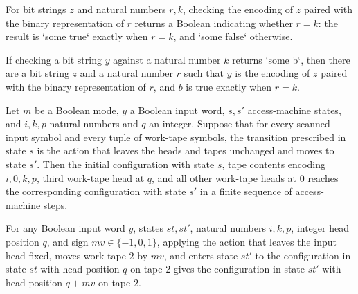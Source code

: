 \begin{lemma}
\label{Complexity.LogProg.accessCheck_pair}
\leanok
{}
For bit strings $z$ and natural numbers $r,k$, checking the encoding of $z$ paired with
the binary representation of $r$ returns a Boolean indicating whether $r=k$: the result
is `some true` exactly when $r=k$, and `some false` otherwise.
\end{lemma}

\begin{lemma}
\label{Complexity.LogProg.accessCheck_some}
\leanok
{}
If checking a bit string $y$ against a natural number $k$ returns `some b`, then there
are a bit string $z$ and a natural number $r$ such that $y$ is the encoding of $z$
paired with the binary representation of $r$, and $b$ is true exactly when $r=k$.
\end{lemma}

\begin{lemma}
\label{Complexity.LogProg.access_go}
\leanok
{}
Let $m$ be a Boolean mode, $y$ a Boolean input word, $s,s'$ access-machine states, and
$i,k,p$ natural numbers and $q$ an integer. Suppose that for every scanned input symbol
and every tuple of work-tape symbols, the transition prescribed in state $s$ is the
action that leaves the heads and tapes unchanged and moves to state $s'$. Then the
initial configuration with state $s$, tape contents encoding $i,0,k,p$, third work-tape
head at $q$, and all other work-tape heads at $0$ reaches the corresponding
configuration with state $s'$ in a finite sequence of access-machine steps.
\end{lemma}

\begin{lemma}
\label{Complexity.LogProg.access_move}
\leanok
{}
For any Boolean input word $y$, states $st,st'$, natural numbers $i,k,p$, integer head
position $q$, and sign $mv\in\{-1,0,1\}$, applying the action that leaves the input head
fixed, moves work tape $2$ by $mv$, and enters state $st'$ to the configuration in state
$st$ with head position $q$ on tape $2$ gives the configuration in state $st'$ with head
position $q+mv$ on tape $2$.
\end{lemma}

